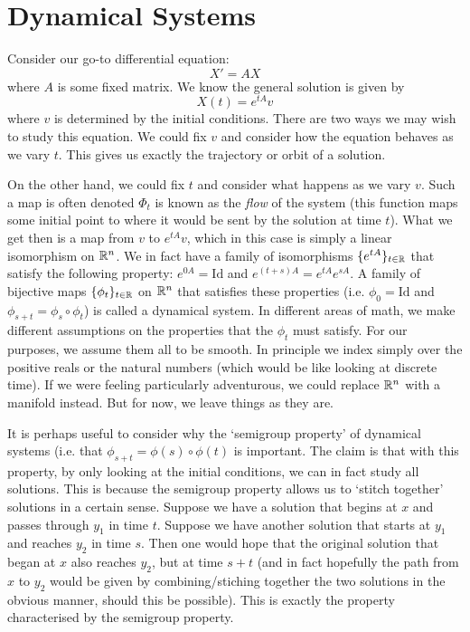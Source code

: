 
\section{Dynamical Systems}\label{sec:dyn-systems}
Consider our go-to differential equation:
$$ X' = AX $$
where $A$ is some fixed matrix. We know the general solution is given by $$ X(t) = e^{tA}v $$ where $v$ is determined by the initial conditions. There are two ways we may wish to study this equation. We could fix $v$ and consider how the equation behaves as we vary $t$. This gives us exactly the trajectory or orbit of a solution.

On the other hand, we could fix $t$ and consider what happens as we vary $v$. Such a map is often denoted $\Phi_t$ is known as the \textit{flow} of the system (this function maps some initial point to where it would be sent by the solution at time $t$). What we get then is a map from $v$ to $e^{tA}v$, which in this case is simply a linear isomorphism on $\mathbb{R}^n$. We in fact have a family of isomorphisms $\{e^{tA}\}_{t \in \mathbb{R}}$ that satisfy the following property: $e^{0A} = \text{Id}$ and $e^{(t + s)A} = e^{tA} e^{sA}$. A family of bijective maps $\{\phi_t\}_{t \in \mathbb{R}}$ on $\mathbb{R}^n$ that satisfies these properties (i.e. $\phi_0 = \text{Id}$ and $\phi_{s + t} = \phi_s \circ \phi_t$) is called a dynamical system. In different areas of math, we make different assumptions on the properties that the $\phi_t$ must satisfy. For our purposes, we assume them all to be smooth. In principle we index simply over the positive reals or the natural numbers (which would be like looking at discrete time). If we were feeling particularly adventurous, we could replace $\mathbb{R}^n$ with a manifold instead. But for now, we leave things as they are.

It is perhaps useful to consider why the `semigroup property' of dynamical systems (i.e. that $\phi_{s + t} = \phi(s) \circ \phi(t)$ is important. The claim is that with this property, by only looking at the initial conditions, we can in fact study all solutions. This is because the semigroup property allows us to `stitch together' solutions in a certain sense. Suppose we have a solution that begins at $x$ and passes through $y_1$ in time $t$. Suppose we have another solution that starts at $y_1$ and reaches $y_2$ in time $s$. Then one would hope that the original solution that began at $x$ also reaches $y_2$, but at time $s + t$ (and in fact hopefully the path from $x$ to $y_2$ would be given by combining/stiching together the two solutions in the obvious manner, should this be possible). This is exactly the property characterised by the semigroup property.

